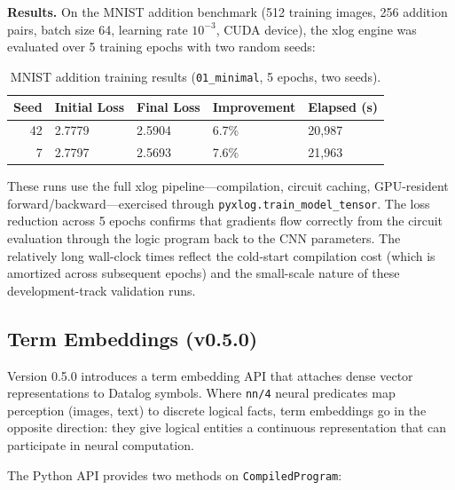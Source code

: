 \textbf{Results.} On the MNIST addition benchmark (512 training images, 256 addition pairs, batch size 64, learning rate $10^{-3}$, CUDA device), the xlog engine was evaluated over 5 training epochs with two random seeds:

\begin{table}[htbp]
  \centering
  \caption{MNIST addition training results (\texttt{01\_minimal}, 5 epochs, two seeds).}
  \label{tab:training-seeds}
  \small
  \begin{tabular}{@{}rllll@{}}
    \toprule
    \textbf{Seed} & \textbf{Initial Loss} & \textbf{Final Loss} & \textbf{Improvement} & \textbf{Elapsed (s)} \\
    \midrule
    42 & 2.7779 & 2.5904 & 6.7\% & 20{,}987 \\
    7  & 2.7797 & 2.5693 & 7.6\% & 21{,}963 \\
    \bottomrule
  \end{tabular}
\end{table}

These runs use the full xlog pipeline---compilation, circuit caching, GPU-resident forward/backward---exercised through \texttt{pyxlog.train\_model\_tensor}. The loss reduction across 5 epochs confirms that gradients flow correctly from the circuit evaluation through the logic program back to the CNN parameters. The relatively long wall-clock times reflect the cold-start compilation cost (which is amortized across subsequent epochs) and the small-scale nature of these development-track validation runs.

\subsection{Term Embeddings (v0.5.0)}

Version 0.5.0 introduces a term embedding API that attaches dense vector representations to Datalog symbols. Where \texttt{nn/4} neural predicates map perception (images, text) to discrete logical facts, term embeddings go in the opposite direction: they give logical entities a continuous representation that can participate in neural computation.

The Python API provides two methods on \texttt{CompiledProgram}:

